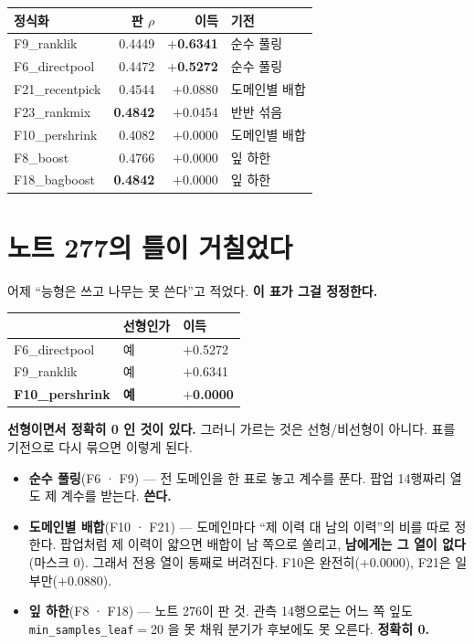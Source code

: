 \documentclass[10pt]{article}
\begin{document}
\begin{center}\small
\begin{tabular}{lrrl}
\hline
정식화 & 판 $\rho$ & 이득 & 기전 \\
\hline
F9\_ranklik & 0.4449 & \textbf{$+$0.6341} & 순수 풀링 \\
F6\_directpool & 0.4472 & \textbf{$+$0.5272} & 순수 풀링 \\
F21\_recentpick & 0.4544 & $+$0.0880 & 도메인별 배합 \\
F23\_rankmix & \textbf{0.4842} & $+$0.0454 & 반반 섞음 \\
F10\_pershrink & 0.4082 & $+$0.0000 & 도메인별 배합 \\
F8\_boost & 0.4766 & $+$0.0000 & 잎 하한 \\
F18\_bagboost & \textbf{0.4842} & $+$0.0000 & 잎 하한 \\
\hline
\end{tabular}
\end{center}

\section{노트 277의 틀이 거칠었다}

어제 ``능형은 쓰고 나무는 못 쓴다''고 적었다. \textbf{이 표가 그걸
정정한다.}

\begin{center}\small
\begin{tabular}{lll}
\hline
& 선형인가 & 이득 \\
\hline
F6\_directpool & 예 & $+$0.5272 \\
F9\_ranklik & 예 & $+$0.6341 \\
\textbf{F10\_pershrink} & \textbf{예} & \textbf{$+$0.0000} \\
\hline
\end{tabular}
\end{center}

\textbf{선형이면서 정확히 0 인 것이 있다.} 그러니 가르는 것은 선형/비선형이
아니다. 표를 기전으로 다시 묶으면 이렇게 된다.

\begin{itemize}
\item \textbf{순수 풀링}(F6 · F9) --- 전 도메인을 한 표로 놓고 계수를 푼다.
팝업 14행짜리 열도 제 계수를 받는다. \textbf{쓴다.}
\item \textbf{도메인별 배합}(F10 · F21) --- 도메인마다 ``제 이력 대 남의
이력''의 비를 따로 정한다. 팝업처럼 제 이력이 얇으면 배합이 남 쪽으로
쏠리고, \textbf{남에게는 그 열이 없다}(마스크 0). 그래서 전용 열이 통째로
버려진다. F10은 완전히($+$0.0000), F21은 일부만($+$0.0880).
\item \textbf{잎 하한}(F8 · F18) --- 노트 276이 판 것. 관측 14행으로는 어느
쪽 잎도 \texttt{min\_samples\_leaf}$=$20 을 못 채워 분기가 후보에도 못
오른다. \textbf{정확히 0.}
\end{itemize}
\end{document}
